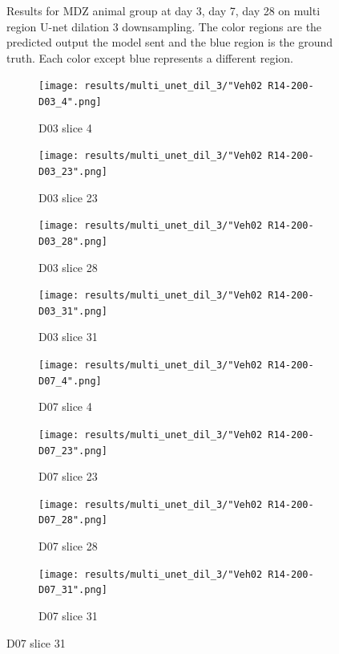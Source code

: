 \begin{figure}[!htb]
  \caption{Results for MDZ animal group at day 3, day 7, day 28 on multi region U-net dilation 3 downsampling. The color regions are the predicted output the model sent and the blue region is the ground truth. Each color except blue represents a different region.}
  \label{fig:results_multi_unetdil3_MDZ}
\end{figure}



\begin{figure}[!htb]  
    \centering %
\begin{subfigure}{0.25\textwidth}
  \texttt{[image: results/multi\_unet\_dil\_3/"Veh02 R14-200-D03\_4".png]}
  \caption{D03 slice 4}
\end{subfigure}\hfil %
\begin{subfigure}{0.25\textwidth}
  \texttt{[image: results/multi\_unet\_dil\_3/"Veh02 R14-200-D03\_23".png]}
  \caption{D03 slice 23}
\end{subfigure}\hfil %
\begin{subfigure}{0.25\textwidth}
  \texttt{[image: results/multi\_unet\_dil\_3/"Veh02 R14-200-D03\_28".png]}
  \caption{D03 slice 28}
\end{subfigure}\hfil %
\begin{subfigure}{0.25\textwidth}
  \texttt{[image: results/multi\_unet\_dil\_3/"Veh02 R14-200-D03\_31".png]}
  \caption{D03 slice 31}
\end{subfigure}

\medskip
\begin{subfigure}{0.25\textwidth}
  \texttt{[image: results/multi\_unet\_dil\_3/"Veh02 R14-200-D07\_4".png]}
  \caption{D07 slice 4}
\end{subfigure}\hfil %
\begin{subfigure}{0.25\textwidth}
  \texttt{[image: results/multi\_unet\_dil\_3/"Veh02 R14-200-D07\_23".png]}
  \caption{D07 slice 23}
\end{subfigure}\hfil %
\begin{subfigure}{0.25\textwidth}
  \texttt{[image: results/multi\_unet\_dil\_3/"Veh02 R14-200-D07\_28".png]}
  \caption{D07 slice 28}
\end{subfigure}\hfil %
\begin{subfigure}{0.25\textwidth}
  \texttt{[image: results/multi\_unet\_dil\_3/"Veh02 R14-200-D07\_31".png]}
  \caption{D07 slice 31}
\end{subfigure}


\end{figure}
